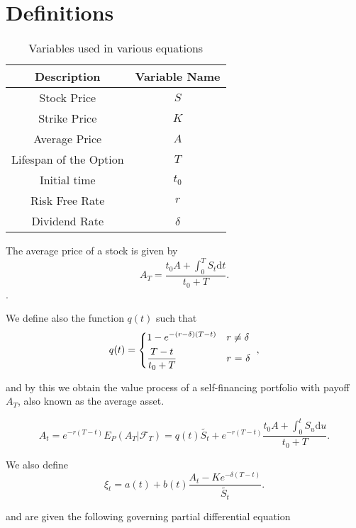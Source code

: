 \documentclass{article}
\begin{document}
\section{Definitions}

\begin{table}[h]
\begin{tabular}{|c|c|}
  \hline
  \textbf{Description} & \textbf{Variable Name} \\ \hline
  Stock Price & \(S\) \\
  Strike Price & \(K\)\\
  Average Price & \(A\) \\
  Lifespan of the Option & \(T\) \\
  Initial time & \(t_0\) \\
  Risk Free Rate & \(r\) \\
  Dividend Rate & \(\delta\) \\
  \hline
\end{tabular}
\caption{Variables used in various equations}
\label{table:name}
\end{table}

The average price of a stock is given by
\begin{equation}
  A_T = \frac{t_0A + \int_0^T S_t \mathrm{d}t}{t_0 + T}.
\end{equation}.

We define also the function \(q(t)\) such that
\begin{equation}
  q(t) =
  \begin{dcases*}
    1 - e^{-(r-\delta)(T-t)} & \(r \neq \delta\) \\
    \frac{T-t}{t_0 + T} & \(r\) = \(\delta\)
  \end{dcases*},
\end{equation}

and by this we obtain the value process of a self-financing portfolio with payoff \(A_T\), also known as the average asset.

\begin{equation}
  A_t = e^{-r(T-t)}E_P(A_T|\mathcal{F}_T) = q(t)\tilde{S_t} + e^{-r(T-t)} \frac{t_0 A + \int_0^tS_u\mathrm{d}u}{t_0+T}.
\end{equation}

We also define
\begin{equation}
  \xi_t = a(t) + b(t) \frac{A_t - Ke^{-\delta(T-t)}}{\tilde{S_t}}.
\end{equation}

and are given the following governing partial differential equation
\end{document}

